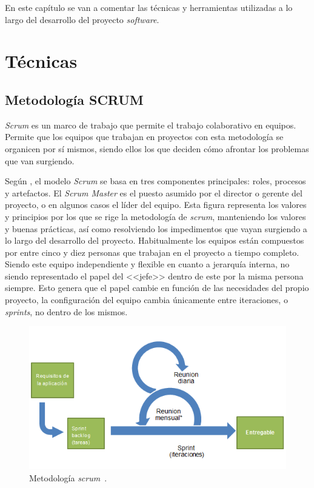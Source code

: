 
En este capítulo se van a comentar las técnicas y herramientas utilizadas a lo largo del desarrollo del proyecto \textit{software}.

\section{Técnicas}\label{sec:tecnicas}

\subsection{Metodología SCRUM}\label{SCRUM}
\textit{Scrum} es un marco de trabajo que permite el trabajo colaborativo en equipos. Permite que los equipos que trabajan en proyectos con esta metodología se organicen por sí mismos, siendo ellos los que deciden cómo afrontar los problemas que van surgiendo. 

Según \cite{cervone2011understanding}, el modelo \textit{Scrum} se basa en tres componentes principales: roles, procesos y artefactos. El \textit{Scrum Master} es el puesto asumido por el director o gerente del proyecto, o en algunos casos el líder del equipo. Esta figura representa los valores y principios por los que se rige la metodología de \textit{scrum}, manteniendo los valores y buenas prácticas, así como resolviendo los impedimentos que vayan surgiendo a lo largo del desarrollo del proyecto. Habitualmente los equipos están compuestos por entre cinco y diez personas que trabajan en el proyecto a tiempo completo. Siendo este equipo independiente y flexible en cuanto a jerarquía interna, no siendo representado el papel del <<jefe>> dentro de este por la misma persona siempre. Esto genera que el papel cambie en función de las necesidades del propio proyecto, la configuración del equipo cambia únicamente entre iteraciones, o \textit{sprints}, no dentro de los mismos.

\begin{figure}[]
	\centering
	\includegraphics[scale=0.5]{../img/anexos/scrum-overview-es}
	\caption{Metodología \textit{scrum}~\cite{SCRUMWIKI}.}\label{img:scrum-overview}
\end{figure}

